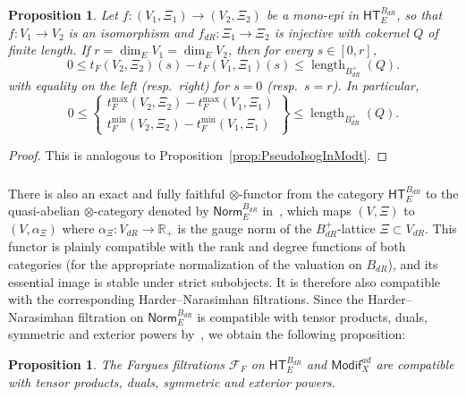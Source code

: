 \documentclass[11pt]{article}
\newtheorem{prop}[theo]{Proposition}
\theoremstyle{definition}
\numberwithin{equation}{section}
\numberwithin{figure}{section}
\numberwithin{table}{section}
\newcommand{\Modif}{\mathsf{Modif}}
\newcommand{\HT}{\mathsf{HT}}
\newcommand{\Norm}{\mathsf{Norm}}
\DeclareMathOperator{\length}{length}
\newcommand*{\dR}{dR}
\begin{document}
\begin{prop}
Let $f:(V_{1},\Xi_{1})\rightarrow(V_{2},\Xi_{2})$ be a mono-epi in $\HT_{E}^{B_{\dR}}$, so that $f:V_{1}\rightarrow V_{2}$ is an isomorphism and $f_{\dR}:\Xi_{1}\rightarrow\Xi_{2}$ is injective with cokernel $Q$ of finite length. If $r=\dim_{E}V_{1}=\dim_{E}V_{2}$, then for every $s\in[0,r]$,
\[
0\leq t_{F}(V_{2},\Xi_{2})(s)-t_{F}(V_{1},\Xi_{1})(s)\leq\length_{B_{\dR}^{+}}(Q).
\]
with equality on the left (resp.~right) for $s=0$ (resp.~$s=r$). In particular,
\[
0\leq\left\{\!
\begin{array}{c}
t_{F}^{\max}(V_{2},\Xi_{2})-t_{F}^{\max}(V_{1},\Xi_{1})\\
t_{F}^{\min}(V_{2},\Xi_{2})-t_{F}^{\min}(V_{1},\Xi_{1})
\end{array}\!\right\} \leq\length_{B_{\dR}^{+}}(Q).
\]
\end{prop}

\begin{proof}
This is analogous to Proposition~\ref{prop:PseudoIsogInModt}.
\end{proof}

\subsubsection{}

There is also an exact and fully faithful $\otimes$-functor from the category $\HT_{E}^{B_{\dR}}$ to the quasi-abelian $\otimes$-category denoted by $\Norm_{E}^{B_{\dR}}$ in~\cite[\S 5.2]{Co16}, which maps $(V,\Xi)$ to $(V,\alpha_{\Xi})$ where $\alpha_{\Xi}:V_{\dR}\rightarrow\mathbb{R}_{+}$ is the gauge norm of the $B_{\dR}^{+}$-lattice $\Xi\subset V_{\dR}$. This functor is plainly compatible with the rank and degree functions of both categories (for the appropriate normalization of the valuation on $B_{\dR}$), and its essential image is stable under strict subobjects. It is therefore also compatible with the corresponding Harder--Narasimhan filtrations. Since the Harder--Narasimhan filtration on $\Norm_{E}^{B_{\dR}}$ is compatible with tensor products, duals, symmetric and exterior powers by~\cite[Proposition~28]{Co16}, we obtain the following proposition:

\begin{prop}\label{prop:OnHT+AdModif_Farguestensor}
The Fargues filtrations $\mathcal{F}_{F}$ on $\HT_{E}^{B_{\dR}}$ and $\Modif_{X}^{ad}$ are compatible with tensor products, duals, symmetric and exterior powers.
\end{prop}
\end{document}
